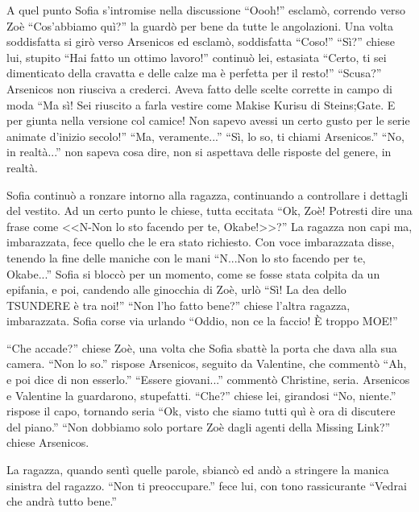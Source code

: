     A quel punto Sofia s'intromise nella discussione ``Oooh!'' esclamò, correndo verso Zoè ``Cos'abbiamo quì?'' la
    guardò per bene da tutte le angolazioni. Una volta soddisfatta si girò verso Arsenicos ed esclamò, soddisfatta
    ``Coso!'' ``Sì?'' chiese lui, stupito ``Hai fatto un ottimo lavoro!'' continuò lei, estasiata ``Certo, ti sei
    dimenticato della cravatta e delle calze ma è perfetta per il resto!'' ``Scusa?'' Arsenicos non riusciva a crederci.
    Aveva fatto delle scelte corrette in campo di moda ``Ma sì! Sei riuscito a farla vestire come Makise Kurisu di
    Steins;Gate. E per giunta nella versione col camice! Non sapevo avessi un certo gusto per le serie animate d'inizio secolo!'' ``Ma, veramente...'' ``Sì,
    lo so, ti chiami Arsenicos.'' ``No, in realtà...'' non sapeva cosa dire, non si aspettava delle risposte del genere,
    in realtà.

    Sofia continuò a ronzare intorno alla ragazza, continuando a controllare i dettagli del vestito. Ad un certo punto
    le chiese, tutta eccitata ``Ok, Zoè! Potresti dire una frase come <<N-Non lo sto facendo per te, Okabe!>>?'' La
    ragazza non capi ma, imbarazzata, fece quello che le era stato richiesto. Con voce imbarazzata disse, tenendo la
    fine delle maniche con le mani ``N...Non lo sto facendo per te, Okabe...'' Sofia si bloccò per un momento, come se
    fosse stata colpita da un epifania, e poi, candendo alle ginocchia di Zoè, urlò ``Sì! La dea dello TSUNDERE è tra
    noi!'' ``Non l'ho fatto bene?'' chiese l'altra ragazza, imbarazzata. Sofia corse via urlando ``Oddio, non ce la
    faccio! È troppo MOE!''

    ``Che accade?'' chiese Zoè, una volta che Sofia sbattè la porta che dava alla sua camera. ``Non lo so.'' rispose
    Arsenicos, seguito da Valentine, che commentò ``Ah, e poi dice di non esserlo.'' ``Essere giovani...'' commentò
    Christine, seria. Arsenicos e Valentine la guardarono, stupefatti. ``Che?'' chiese lei, girandosi ``No, niente.''
    rispose il capo, tornando seria ``Ok, visto che siamo tutti quì è ora di discutere del piano.'' ``Non dobbiamo solo
    portare Zoè dagli agenti della Missing Link?'' chiese Arsenicos.

    La ragazza, quando sentì quelle parole, sbiancò ed andò a stringere la manica sinistra del ragazzo. ``Non ti
    preoccupare.'' fece lui, con tono rassicurante ``Vedrai che andrà tutto bene.''
